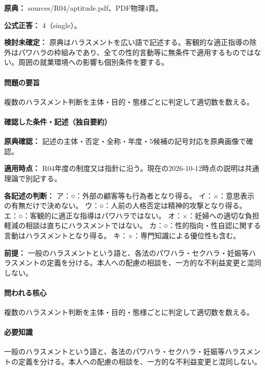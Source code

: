 \noindent\textbf{原典：} sources/R04/aptitude.pdf、PDF物理4頁。

\textbf{公式正答：} 4（single）。

\par\textbf{検討未確定：} 原典はハラスメントを広い語で記述する。客観的な適正指導の除外はパワハラの枠組みであり、全ての性的言動等に無条件で適用するものではない。周囲の就業環境への影響も個別条件を要する。

\paragraph{問題の要旨} 複数のハラスメント判断を主体・目的・態様ごとに判定して適切数を数える。

\paragraph{確認した条件・記述（独自要約）}\mbox{}\par

\noindent\textbf{原典確認：} 記述の主体・否定・全称・年度・5候補の記号対応を原典画像で確認。\par

\noindent\textbf{適用時点：} R04年度の制度又は指針に沿う。現在の2026-10-12時点の説明は共通理論で別記する。\par

\noindent\textbf{各記述の判断：} ア：○：外部の顧客等も行為者となり得る。 イ：×：意思表示の有無だけで決めない。 ウ：○：人前の人格否定は精神的攻撃となり得る。 エ：○：客観的に適正な指導はパワハラではない。 オ：×：妊婦への適切な負担軽減の相談は直ちにハラスメントではない。 カ：○：性的指向・性自認に関する言動はハラスメントとなり得る。 キ：×：専門知識による優位性も含む。\par

\noindent\textbf{前提：} 一般のハラスメントという語と、各法のパワハラ・セクハラ・妊娠等ハラスメントの定義を分ける。本人への配慮の相談を、一方的な不利益変更と混同しない。\par

\paragraph{問われる核心} 複数のハラスメント判断を主体・目的・態様ごとに判定して適切数を数える。

\paragraph{必要知識} 一般のハラスメントという語と、各法のパワハラ・セクハラ・妊娠等ハラスメントの定義を分ける。本人への配慮の相談を、一方的な不利益変更と混同しない。

